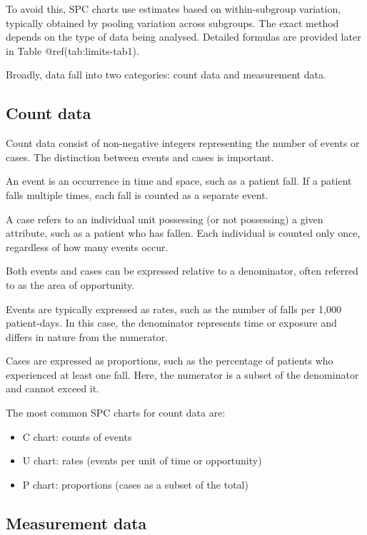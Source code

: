 \documentclass[
]{book}
\providecommand{\tightlist}{%
  \setlength{\itemsep}{0pt}\setlength{\parskip}{0pt}}
\begin{document}
To avoid this, SPC charts use estimates based on within-subgroup
variation, typically obtained by pooling variation across subgroups. The
exact method depends on the type of data being analysed. Detailed
formulas are provided later in Table @ref(tab:limits-tab1).

Broadly, data fall into two categories: count data and measurement data.

\subsection{Count data}\label{count-data}

Count data consist of non-negative integers representing the number of
events or cases. The distinction between events and cases is important.

An event is an occurrence in time and space, such as a patient fall. If
a patient falls multiple times, each fall is counted as a separate
event.

A case refers to an individual unit possessing (or not possessing) a
given attribute, such as a patient who has fallen. Each individual is
counted only once, regardless of how many events occur.

Both events and cases can be expressed relative to a denominator, often
referred to as the area of opportunity.

Events are typically expressed as rates, such as the number of falls per
1,000 patient-days. In this case, the denominator represents time or
exposure and differs in nature from the numerator.

Cases are expressed as proportions, such as the percentage of patients
who experienced at least one fall. Here, the numerator is a subset of
the denominator and cannot exceed it.

The most common SPC charts for count data are:

\begin{itemize}
\tightlist
\item
  C chart: counts of events
\item
  U chart: rates (events per unit of time or opportunity)
\item
  P chart: proportions (cases as a subset of the total)
\end{itemize}

\subsection{Measurement data}\label{measurement-data}
\end{document}
